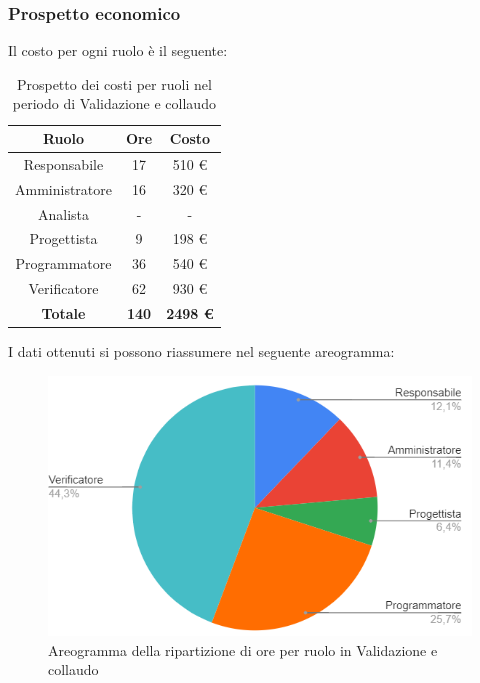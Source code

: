 \subsubsection{Prospetto economico}
Il costo per ogni ruolo è il seguente:
\begin{table}[H]
		\begin{center}
			\setlength{\aboverulesep}{0pt}
			\setlength{\belowrulesep}{0pt}
			\setlength{\extrarowheight}{.75ex}
			\begin{tabular}{ c c c }
				\rowcolor{AzzurroGruppo!30} 
				\textbf{Ruolo} & \textbf{Ore} & \textbf{Costo}  \\
				\toprule
				Responsabile   & 17 & 510 \euro \\
				Amministratore & 16 & 320 \euro \\
				Analista       & -  & - \\
				Progettista    & 9  & 198 \euro \\
				Programmatore  & 36 & 540 \euro \\
				Verificatore   & 62 & 930 \euro \\
				\textbf{Totale} & \textbf{140} & \textbf{2498 \euro} \\
				\bottomrule
			\end{tabular}
			\caption{ Prospetto dei costi per ruoli nel periodo di Validazione e collaudo}
		\end{center}
	\end{table}
I dati ottenuti si possono riassumere nel seguente areogramma:
\begin{figure}[H]
    \centering
    \includegraphics[scale = 0.5]{components/img/validazione_torta.png}
    \caption{ Areogramma della ripartizione di ore per ruolo in Validazione e collaudo}
    \label{fig:Areogramma ripartizione ore , fase di Validazione e collaudo}
\end{figure}

